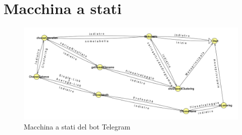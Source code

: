 






\section{Macchina a stati}


\begin{figure}
    \centering
    \includegraphics[width=.5\textwidth]{images/macchina a stati.png}
    \caption{Macchina a stati del bot Telegram}
\end{figure}


